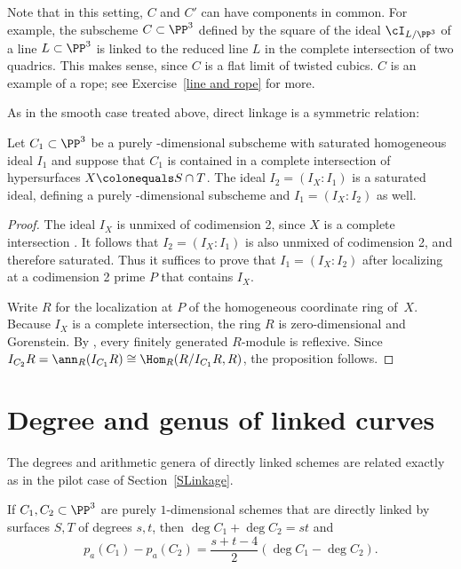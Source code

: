 Note that in this setting, $C$ and $C'$ can have components in
common. For example, the subscheme $C \subset
\PP^3$ defined by the square of the ideal $\cI_{L/\PP^3}$ of a line $L
\subset \PP^3$ is linked to the reduced line $L$ in the complete
intersection of two quadrics.
This makes sense, since $C$ is a
flat limit of twisted cubics.
$C$ is an example of a rope; see
%
Exercise~\ref{line and rope} for more.

As in the smooth case treated above, direct linkage is a symmetric
relation:

\begin{proposition}\label{link unmixed}
Let $C_1\subset \PP^3$ be a purely \1-dimensional subscheme with saturated
%
homogeneous ideal $I_1$ and suppose that $C_1$ is contained in a complete
intersection of
hypersurfaces $X \colonequals  S\cap T$. The ideal $I_2 = (I_{X}:I_1)$
is a saturated ideal, defining a purely \1-dimensional subscheme and
$I_1 = (I_{X}: I_2)$ as well.
\unif
\end{proposition}

\begin{proof}
The ideal $I_{X}$ is unmixed of
%
codimension 2, since $X$ is a complete intersection
\cite[Proposition 18.13]{Eisenbud1995}. It follows
that $I_2 = (I_{X}:I_1)$
is also unmixed of codimension 2,
and therefore
saturated.
Thus it suffices to prove that $I_1 = (I_{X}: I_2)$ after localizing at
a codimension 2 prime $P$
that contains $I_{X}$.

Write $R$ for the localization at $P$ of the homogeneous coordinate ring
of~$X$.
Because $I_{X}$ is a complete intersection, the ring $R$
is zero-dimensional and
Gorenstein.
%
By \cite[Propositions 21.1 and 21.5]{Eisenbud1995}, every finitely
%
generated $R$-module is
reflexive.
Since
$I_{C_2}R= \ann_{R}(I_{C_1}R) \cong \Hom_R(R/I_{C_1}R, R)$,
the proposition follows.
\end{proof}

\section{Degree and genus of linked curves}
\label{duality} %

The degrees and
arithmetic genera
%
of directly linked schemes are related \null exactly as in the
pilot case of Section~\ref{SLinkage}.

\begin{theorem}\label{direct linkage}\label{linked genus formula}
If $C_1,C_2\subset \PP^3$ are purely $1$-dimensional schemes that are
directly linked by surfaces $S,T$ of degrees $s,t$, then
$\deg C_1+\deg C_2 = st$ and
\vspace*{3pt}
$$
p_a(C_1) - p_a(C_2) = \frac{s+t-4}{2}(\deg C_1-\deg C_2).
$$
\end{theorem}

